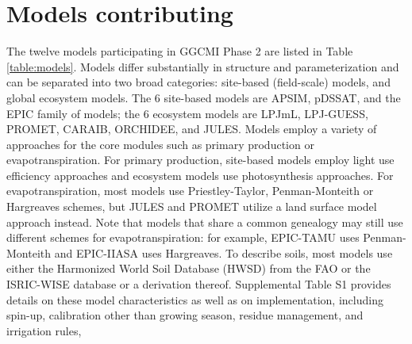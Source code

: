 \documentclass[gmd, manuscript]{copernicus} %
\begin{document}
\section{Models contributing}
\label{S:3}

The twelve models participating in GGCMI Phase 2 are listed in Table \ref{table:models}. 
Models differ substantially in structure and parameterization and can be separated into two broad categories: site-based (field-scale) models, and global ecosystem models.
The 6 site-based models are APSIM, pDSSAT, and the EPIC family of models; the 6 ecosystem models are LPJmL, LPJ-GUESS, PROMET, CARAIB, ORCHIDEE, and JULES.
Models employ a variety of approaches for the core modules such as primary production or evapotranspiration.
For primary production, site-based models employ light use efficiency approaches and ecosystem models use photosynthesis approaches.
For evapotranspiration, most models use Priestley-Taylor, Penman-Monteith or Hargreaves schemes, but JULES and PROMET utilize a land surface model approach instead. 
Note that models that share a common genealogy may still use different schemes for evapotranspiration:
for example, EPIC-TAMU uses Penman-Monteith and EPIC-IIASA uses Hargreaves.
To describe soils, most models use either the Harmonized World Soil Database (HWSD) from the FAO \citep{FAOSOIL2008} or the ISRIC-WISE database \citep{BatjesL2008} or a derivation thereof.
Supplemental Table S1 provides details on these model characteristics as well as on implementation, including spin-up, calibration other than growing season, residue management, and irrigation rules,
\end{document}
